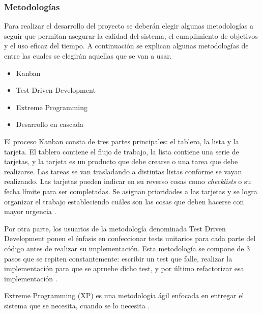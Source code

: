 \documentclass[twoside]{article}
\begin{document}
\subsubsection{Metodologías}
Para realizar el desarrollo del proyecto se deberán elegir algunas metodologías a seguir que permitan asegurar la calidad del sistema, el cumplimiento de objetivos y el uso eficaz del tiempo. A continuación se explican algunas metodologías de entre las cuales se elegirán aquellas que se van a usar.
\begin{itemize}
    \item Kanban
    \item Test Driven Development
    \item Extreme Programming
    \item Desarrollo en cascada
\end{itemize}
El proceso Kanban consta de tres partes principales: el tablero, la lista y la tarjeta. El tablero contiene el flujo de trabajo, la lista contiene una serie de tarjetas, y la tarjeta es un producto que debe crearse o una tarea que debe realizarse. Las tareas se van trasladando a distintas listas conforme se vayan realizando. Las tarjetas pueden indicar en su reverso cosas como \textit{checklists} o su fecha límite para ser completadas. Se asignan prioridades a las tarjetas y se logra organizar el trabajo estableciendo cuáles son las cosas que deben hacerse con mayor urgencia \parencite{completeGuideAgile}.

Por otra parte, los usuarios de la metodología denominada Test Driven Development ponen el énfasis en confeccionar tests unitarios para cada parte del código antes de realizar su implementación. Esta metodología se compone de 3 pasos que se repiten constantemente: escribir un test que falle, realizar la implementación para que se apruebe dicho test, y por último refactorizar esa implementación \parencite[pp. 19-20]{testingJavascript}.

Extreme Programming (XP) es una metodología ágil enfocada en entregar el sistema que se necesita, cuando se lo necesita \parencite{xp}.
\end{document}
